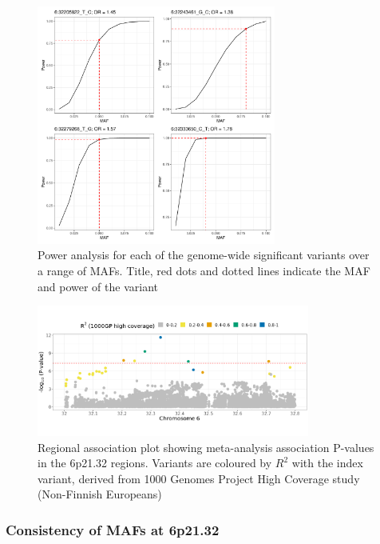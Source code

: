     \begin{figure}[H] 
      \centering    
      \includegraphics[width=0.7\textwidth]{power_analysis}
      \caption[Figure]{Power analysis for each of the genome-wide significant variants over a range of MAFs. Title, red dots and dotted lines indicate the MAF and power of the variant}
      \label{fig:power_analysis}
      \end{figure}
    
     
    \begin{figure}[H] 
      \centering    
      \includegraphics[width=0.8\textwidth]{Vector/regional_assoc_plot}
      \caption[Figure]{Regional association plot showing meta-analysis association P-values in the 6p21.32 regions. Variants are coloured by $R^{2}$ with the index variant, derived from 1000 Genomes Project High Coverage study (Non-Finnish Europeans)}
      \label{fig:regional_assoc_plot}
      \end{figure}
    \subsubsection{Consistency of MAFs at 6p21.32}
   
